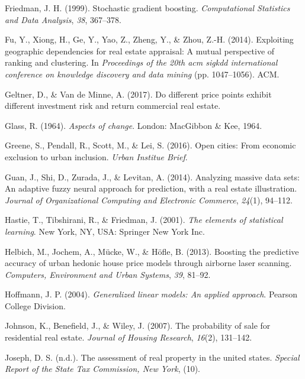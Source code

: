 \documentclass[12pt,]{article}
\begin{document}
\leavevmode\hypertarget{ref-Friedman99stochasticgradient}{}%
Friedman, J. H. (1999). Stochastic gradient boosting.
\emph{Computational Statistics and Data Analysis}, \emph{38}, 367--378.

\leavevmode\hypertarget{ref-Fu2014}{}%
Fu, Y., Xiong, H., Ge, Y., Yao, Z., Zheng, Y., \& Zhou, Z.-H. (2014).
Exploiting geographic dependencies for real estate appraisal: A mutual
perspective of ranking and clustering. In \emph{Proceedings of the 20th
acm sigkdd international conference on knowledge discovery and data
mining} (pp. 1047--1056). ACM.

\leavevmode\hypertarget{ref-Geltner2017}{}%
Geltner, D., \& Van de Minne, A. (2017). Do different price points
exhibit different investment risk and return commercial real estate.

\leavevmode\hypertarget{ref-glass1964}{}%
Glass, R. (1964). \emph{Aspects of change}. London: MacGibbon \& Kee,
1964.

\leavevmode\hypertarget{ref-urban2016}{}%
Greene, S., Pendall, R., Scott, M., \& Lei, S. (2016). Open cities: From
economic exclusion to urban inclusion. \emph{Urban Institue Brief}.

\leavevmode\hypertarget{ref-Guan2014}{}%
Guan, J., Shi, D., Zurada, J., \& Levitan, A. (2014). Analyzing massive
data sets: An adaptive fuzzy neural approach for prediction, with a real
estate illustration. \emph{Journal of Organizational Computing and
Electronic Commerce}, \emph{24}(1), 94--112.

\leavevmode\hypertarget{ref-hastie01statisticallearning}{}%
Hastie, T., Tibshirani, R., \& Friedman, J. (2001). \emph{The elements
of statistical learning}. New York, NY, USA: Springer New York Inc.

\leavevmode\hypertarget{ref-Helbich2013}{}%
Helbich, M., Jochem, A., Mücke, W., \& Höfle, B. (2013). Boosting the
predictive accuracy of urban hedonic house price models through airborne
laser scanning. \emph{Computers, Environment and Urban Systems},
\emph{39}, 81--92.

\leavevmode\hypertarget{ref-hoffmann2004generalized}{}%
Hoffmann, J. P. (2004). \emph{Generalized linear models: An applied
approach}. Pearson College Division.

\leavevmode\hypertarget{ref-Johnson2007}{}%
Johnson, K., Benefield, J., \& Wiley, J. (2007). The probability of sale
for residential real estate. \emph{Journal of Housing Research},
\emph{16}(2), 131--142.

\leavevmode\hypertarget{ref-Silverherz1936}{}%
Joseph, D. S. (n.d.). The assessment of real property in the united
states. \emph{Special Report of the State Tax Commission, New York},
(10).
\end{document}
